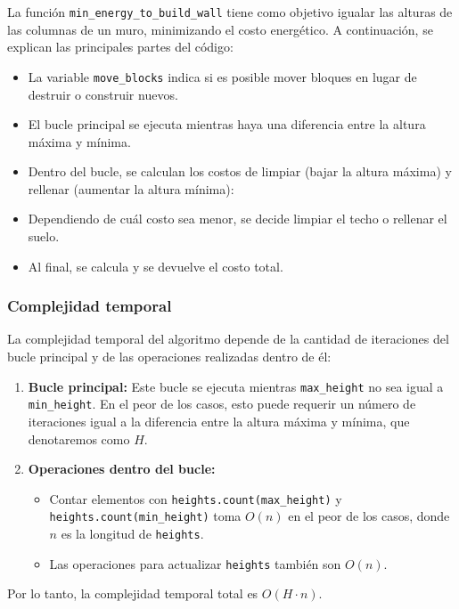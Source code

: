 \documentclass[a4paper,12pt]{article}
\begin{document}
La función \texttt{min\_energy\_to\_build\_wall} tiene como objetivo igualar las alturas de las columnas de un muro, minimizando el costo energético. A continuación, se explican las principales partes del código:

\begin{itemize}
	\item La variable \texttt{move\_blocks} indica si es posible mover bloques en lugar de destruir o construir nuevos.
	\item El bucle principal se ejecuta mientras haya una diferencia entre la altura máxima y mínima.
	\item Dentro del bucle, se calculan los costos de limpiar (bajar la altura máxima) y rellenar (aumentar la altura mínima):
	\item Dependiendo de cuál costo sea menor, se decide limpiar el techo o rellenar el suelo.
	\item Al final, se calcula y se devuelve el costo total.
\end{itemize}

\subsubsection{Complejidad temporal}

La complejidad temporal del algoritmo depende de la cantidad de iteraciones del bucle principal y de las operaciones realizadas dentro de él:

\begin{enumerate}
	\item \textbf{Bucle principal:} Este bucle se ejecuta mientras \texttt{max\_height} no sea igual a \texttt{min\_height}. En el peor de los casos, esto puede requerir un número de iteraciones igual a la diferencia entre la altura máxima y mínima, que denotaremos como \( H \).
	\item \textbf{Operaciones dentro del bucle:}
	\begin{itemize}
		\item Contar elementos con \texttt{heights.count(max\_height)} y \texttt{heights.count(min\_height)} toma \( O(n) \) en el peor de los casos, donde \( n \) es la longitud de \texttt{heights}.
		\item Las operaciones para actualizar \texttt{heights} también son \( O(n) \).
	\end{itemize}
\end{enumerate}

Por lo tanto, la complejidad temporal total es \( O(H \cdot n) \).
\end{document}
